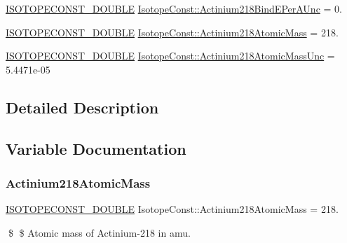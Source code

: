 \begin{DoxyCompactItemize}
\mbox{\hyperlink{group___isotope_const-_macros_ga8f45a7272ce02c0b4c65c44636ed719a}{I\+S\+O\+T\+O\+P\+E\+C\+O\+N\+S\+T\+\_\+\+D\+O\+U\+B\+LE}} \mbox{\hyperlink{group___isotope_const-_actinium-_ac218_gadd7b4cf2ef641a36acb37cdb1b699482}{Isotope\+Const\+::\+Actinium218\+Bind\+E\+Per\+A\+Unc}} = 0.
\item 
\mbox{\hyperlink{group___isotope_const-_macros_ga8f45a7272ce02c0b4c65c44636ed719a}{I\+S\+O\+T\+O\+P\+E\+C\+O\+N\+S\+T\+\_\+\+D\+O\+U\+B\+LE}} \mbox{\hyperlink{group___isotope_const-_actinium-_ac218_gae683cc9bde2713e453138bd5ac0ad7d1}{Isotope\+Const\+::\+Actinium218\+Atomic\+Mass}} = 218.
\item 
\mbox{\hyperlink{group___isotope_const-_macros_ga8f45a7272ce02c0b4c65c44636ed719a}{I\+S\+O\+T\+O\+P\+E\+C\+O\+N\+S\+T\+\_\+\+D\+O\+U\+B\+LE}} \mbox{\hyperlink{group___isotope_const-_actinium-_ac218_gacbc94759794cc26bb0651f66a7ffc960}{Isotope\+Const\+::\+Actinium218\+Atomic\+Mass\+Unc}} = 5.\+4471e-\/05
\end{DoxyCompactItemize}


\subsection{Detailed Description}


\subsection{Variable Documentation}
\mbox{\label{group___isotope_const-_actinium-_ac218_gae683cc9bde2713e453138bd5ac0ad7d1}} 
\subsubsection{\texorpdfstring{Actinium218\+Atomic\+Mass}{Actinium218AtomicMass}}
{\footnotesize\ttfamily \mbox{\hyperlink{group___isotope_const-_macros_ga8f45a7272ce02c0b4c65c44636ed719a}{I\+S\+O\+T\+O\+P\+E\+C\+O\+N\+S\+T\+\_\+\+D\+O\+U\+B\+LE}} Isotope\+Const\+::\+Actinium218\+Atomic\+Mass = 218.}

\$ \$ Atomic mass of Actinium-\/218 in amu. \mbox{\label{group___isotope_const-_actinium-_ac218_gacbc94759794cc26bb0651f66a7ffc960}} 
